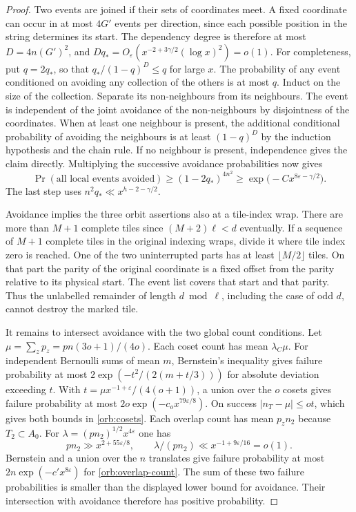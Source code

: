 \begin{proof}
Two events are joined if their sets of coordinates meet. A fixed
coordinate can occur in at most \(4G'\) events per direction, since
each possible position in the string determines its start. The
dependency degree is therefore at most \(D=4n(G')^2\), and
\(Dq_*=O_\varepsilon(x^{-2+3\gamma/2}(\log x)^2)=o(1)\).
For completeness, put \(q=2q_*\), so that
\(q_*/(1-q)^D\le q\) for large \(x\). The probability of any event
conditioned on avoiding any collection of the others is at most \(q\).
Induct on the size of the collection. Separate its non-neighbours
from its neighbours. The event is independent of the joint avoidance
of the non-neighbours by disjointness of the coordinates. When at least
one neighbour is present, the additional conditional probability of
avoiding the neighbours is at least \((1-q)^D\) by the induction
hypothesis and the chain rule. If no neighbour is present, independence
gives the claim directly. Multiplying the successive avoidance
probabilities now gives
\[
 \Pr(\text{all local events avoided})
 \ge (1-2q_*)^{4n^2}
 \ge \exp\big(-C x^{8\varepsilon-\gamma/2}\big).
\]
The last step uses \(n^2q_*\ll x^{h-2-\gamma/2}\).

Avoidance implies the three orbit assertions also at a tile-index wrap.
There are more than \(M+1\) complete tiles since
\((M+2)\ell<d\) eventually. If a sequence of \(M+1\) complete tiles
in the original indexing wraps, divide it where tile index zero is
reached. One of the two uninterrupted parts has at least
\(\lfloor M/2\rfloor\) tiles. On that part the parity of the original
coordinate is a fixed offset from the parity relative to its physical
start. The event list covers that start and that parity. Thus the
unlabelled remainder of length \(d\bmod\ell\), including the case of
odd \(d\), cannot destroy the marked tile.

It remains to intersect avoidance with the two global count conditions.
Let \(\mu=\sum_zp_z=pn(3o+1)/(4o)\). Each coset count has mean
\(\lambda_C\mu\). For independent Bernoulli sums of mean \(m\),
Bernstein's inequality gives failure probability at most
\(2\exp(-t^2/(2(m+t/3)))\) for absolute deviation exceeding \(t\).
With \(t=\mu x^{-1+\varepsilon}/(4(o+1))\), a union over the \(o\)
cosets gives failure probability at most
\(2o\exp(-c_o x^{79\varepsilon/8})\). On success
\(|n_T-\mu|\le ot\), which gives both bounds in \eqref{orb:cosets}.
Each overlap count has mean \(p_z n_2\) because \(T_2\subset A_0\).
For \(\lambda=(pn_2)^{1/2}x^{4\varepsilon}\) one has
\[
 pn_2\gg x^{2+55\varepsilon/8},
 \qquad \lambda/(pn_2)\ll x^{-1+9\varepsilon/16}=o(1).
\]
Bernstein and a union over the \(n\) translates give failure probability
at most \(2n\exp(-c' x^{8\varepsilon})\) for \eqref{orb:overlap-count}.
The sum of these two failure probabilities is smaller than the
displayed lower bound for avoidance. Their intersection with avoidance
therefore has positive probability.
\end{proof}

